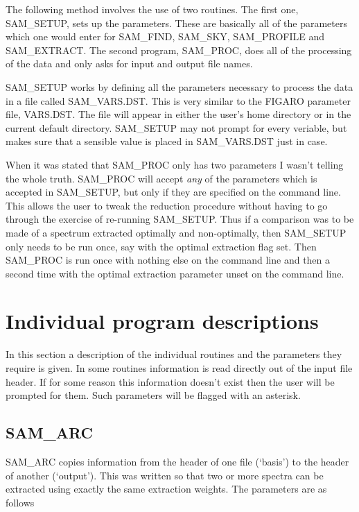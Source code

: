 The following method involves the use of two routines.  The first one,
SAM\_SETUP, sets up the parameters.  These are basically all of the parameters
which one would enter for SAM\_FIND, SAM\_SKY, SAM\_PROFILE and SAM\_EXTRACT.
The second program, SAM\_PROC, does all of the processing of the data and only
asks for input and output file names.

SAM\_SETUP works by defining all the parameters necessary to process the data
in a file called SAM\_VARS.DST.  This is very similar to the FIGARO parameter
file, VARS.DST.  The file will appear in either the user's home directory or
in the current default directory.  SAM\_SETUP may not prompt for every
veriable, but makes sure that a sensible value is placed in SAM\_VARS.DST just
in case.

When it was stated that SAM\_PROC only has two parameters I wasn't telling the
whole truth.  SAM\_PROC will accept {\em any} of the parameters which is
accepted in SAM\_SETUP, but only if they are specified on the command line.
This allows the user to tweak the reduction procedure without having to go
through the exercise of re-running SAM\_SETUP.  Thus if a comparison was to be
made of a spectrum extracted optimally and non-optimally, then SAM\_SETUP only
needs to be run once, say with the optimal extraction flag set.  Then
SAM\_PROC is run once with nothing else on the command line and then a second
time with the optimal extraction parameter unset on the command line.

\section{Individual program descriptions} \label{sec:indiv}

In this section a description of the individual routines and the parameters
they require is given.  In some routines information is read directly out of
the input file header.  If for some reason this information doesn't exist then
the user will be prompted for them.  Such parameters will be flagged with an
asterisk.

\subsection{SAM\_ARC}

SAM\_ARC copies information from the header of one file (`basis') to the
header of another (`output').  This was written so that two or more spectra
can be extracted using exactly the same extraction weights.  The parameters
are  as follows

